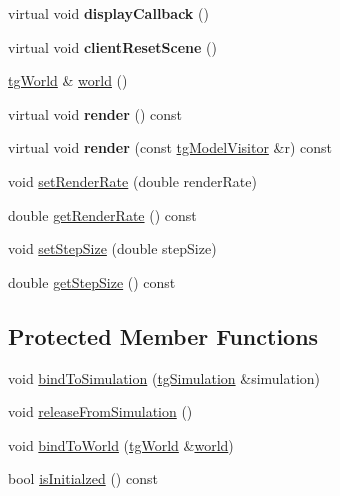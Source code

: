 \begin{DoxyCompactItemize}
\item 
\hypertarget{classtg_sim_view_graphics_aa648f034797dbf8bc08eb26fbd9cb24a}{virtual void {\bfseries display\-Callback} ()}\label{classtg_sim_view_graphics_aa648f034797dbf8bc08eb26fbd9cb24a}

\item 
\hypertarget{classtg_sim_view_graphics_a6f84aeef214dde2e449e3879fd7037ec}{virtual void {\bfseries client\-Reset\-Scene} ()}\label{classtg_sim_view_graphics_a6f84aeef214dde2e449e3879fd7037ec}

\item 
\hyperlink{classtg_world}{tg\-World} \& \hyperlink{classtg_sim_view_a349682d852193ee75f416ab07c2d4a62}{world} ()
\item 
\hypertarget{classtg_sim_view_a7bf87646393669230e8fabad93c0a28a}{virtual void {\bfseries render} () const }\label{classtg_sim_view_a7bf87646393669230e8fabad93c0a28a}

\item 
\hypertarget{classtg_sim_view_a56670457205774668e538fa161bb02ad}{virtual void {\bfseries render} (const \hyperlink{classtg_model_visitor}{tg\-Model\-Visitor} \&r) const }\label{classtg_sim_view_a56670457205774668e538fa161bb02ad}

\item 
void \hyperlink{classtg_sim_view_a124c599e7618649152438b3e85b1751f}{set\-Render\-Rate} (double render\-Rate)
\item 
double \hyperlink{classtg_sim_view_a2c8fe5bf37fe3e4c1363a79d64562a74}{get\-Render\-Rate} () const 
\item 
void \hyperlink{classtg_sim_view_a57146a5d1870729f032ed837cd12b249}{set\-Step\-Size} (double step\-Size)
\item 
double \hyperlink{classtg_sim_view_a06d8813edb22889a2b05f6930ee8b1c5}{get\-Step\-Size} () const 
\end{DoxyCompactItemize}
\subsection*{Protected Member Functions}
\begin{DoxyCompactItemize}
\item 
void \hyperlink{classtg_sim_view_a59e394221f148b53c44b4e3fad63c24e}{bind\-To\-Simulation} (\hyperlink{classtg_simulation}{tg\-Simulation} \&simulation)
\item 
void \hyperlink{classtg_sim_view_a8be0601b92a91c6f2bd1b519c9d68094}{release\-From\-Simulation} ()
\item 
void \hyperlink{classtg_sim_view_a6574a330b0123ebdfd8573b431c785c8}{bind\-To\-World} (\hyperlink{classtg_world}{tg\-World} \&\hyperlink{classtg_sim_view_a349682d852193ee75f416ab07c2d4a62}{world})
\item 
bool \hyperlink{classtg_sim_view_ae0154bfc6695adbc59116c1455e968e9}{is\-Initialzed} () const 
\end{DoxyCompactItemize}
